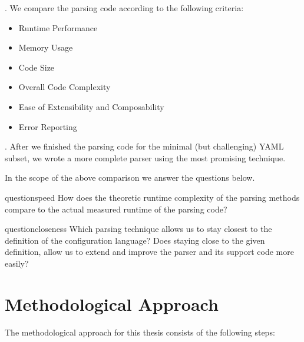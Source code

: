 . We compare the parsing code according to the following criteria:

\begin{itemize}
  \item Runtime Performance
  \item Memory Usage
  \item Code Size
  \item Overall Code Complexity
  \item Ease of Extensibility and Composability
  \item Error Reporting
\end{itemize}

. After we finished the parsing code for the minimal (but challenging) YAML subset, we wrote a more complete  parser using the most promising technique.

In the scope of the above comparison we answer the questions below.

%
%
\begin{restatable}{question}{speed}
  \label{que:speed}
  How does the theoretic runtime complexity of the parsing methods compare to the actual measured runtime of the parsing code?
\end{restatable}

\begin{restatable}{question}{closeness}
  \label{que:closeness}
  Which parsing technique allows us to stay closest to the definition of the configuration language? Does staying close to the given definition,
  allow us to extend and improve the parser and its support code more easily?
\end{restatable}

\section{Methodological Approach}

The methodological approach for this thesis consists of the following steps:

